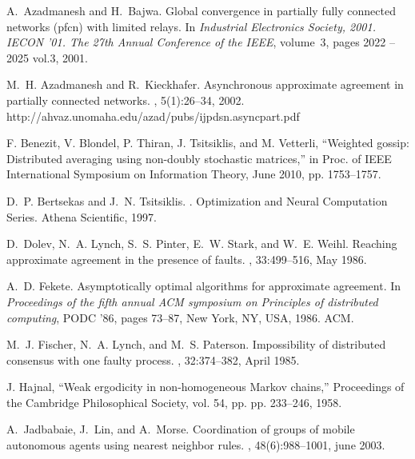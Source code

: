 \documentclass[letterpaper, 12pt]{article}
\begin{document}
\begin{thebibliography}{10}

A.~Azadmanesh and H.~Bajwa.
\newblock Global convergence in partially fully connected networks (pfcn) with
  limited relays.
\newblock In {\em Industrial Electronics Society, 2001. IECON '01. The 27th
  Annual Conference of the IEEE}, volume~3, pages 2022 --2025 vol.3, 2001.

M.~H. Azadmanesh and R.~Kieckhafer.
\newblock Asynchronous approximate agreement in partially connected networks.
, 5(1):26--34, 2002.
\newblock http://ahvaz.unomaha.edu/azad/pubs/ijpdsn.asyncpart.pdf

F. Benezit, V. Blondel, P. Thiran, J. Tsitsiklis, and M. Vetterli, “Weighted gossip: Distributed averaging using non-doubly stochastic
matrices,” in Proc. of IEEE International Symposium on Information Theory, June 2010, pp. 1753--1757.

D.~P. Bertsekas and J.~N. Tsitsiklis.
.
\newblock Optimization and Neural Computation Series. Athena Scientific, 1997.

D.~Dolev, N.~A. Lynch, S.~S. Pinter, E.~W. Stark, and W.~E. Weihl.
\newblock Reaching approximate agreement in the presence of faults.
, 33:499--516, May 1986.


A.~D. Fekete.
\newblock Asymptotically optimal algorithms for approximate agreement.
\newblock In {\em Proceedings of the fifth annual ACM symposium on Principles
  of distributed computing}, PODC '86, pages 73--87, New York, NY, USA, 1986.
  ACM.

M.~J. Fischer, N.~A. Lynch, and M.~S. Paterson.
\newblock Impossibility of distributed consensus with one faulty process.
, 32:374--382, April 1985.

J. Hajnal, ``Weak ergodicity in non-homogeneous Markov chains,” Proceedings of the Cambridge Philosophical Society, vol. 54, pp.
pp. 233--246, 1958.

A.~Jadbabaie, J.~Lin, and A.~Morse.
\newblock Coordination of groups of mobile autonomous agents using nearest
  neighbor rules.
, 48(6):988--1001,
  june 2003.


\end{thebibliography}
\end{document}
